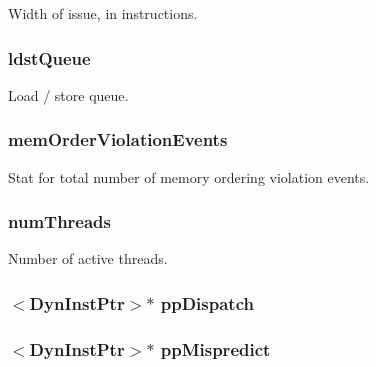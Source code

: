 \label{classDefaultIEW_a574eb3fb1659bd364f4f613662fa2ead}
Width of issue, in instructions. \hypertarget{classDefaultIEW_a9f2a7c471091519f7d05832eb48c2a9d}{
\subsubsection[{ldstQueue}]{ {\bf ldstQueue}}}
\label{classDefaultIEW_a9f2a7c471091519f7d05832eb48c2a9d}
Load / store queue. \hypertarget{classDefaultIEW_a4cca8a82790f3c5dd13bd5c0b32ad774}{
\subsubsection[{memOrderViolationEvents}]{ {\bf memOrderViolationEvents}}}
\label{classDefaultIEW_a4cca8a82790f3c5dd13bd5c0b32ad774}
Stat for total number of memory ordering violation events. \hypertarget{classDefaultIEW_a88377f855dbf5adeeecb06b5bb821d35}{
\subsubsection[{numThreads}]{ {\bf numThreads}}}
\label{classDefaultIEW_a88377f855dbf5adeeecb06b5bb821d35}
Number of active threads. \hypertarget{classDefaultIEW_acf84d288c6bc7f3ffbb09eb080dcbb7b}{
\subsubsection[{ppDispatch}]{$<${\bf DynInstPtr}$>$$\ast$ {\bf ppDispatch}}}
\label{classDefaultIEW_acf84d288c6bc7f3ffbb09eb080dcbb7b}
\hypertarget{classDefaultIEW_a78ed80917b5ebd419bf614b2e3b8f2cb}{
\subsubsection[{ppMispredict}]{$<${\bf DynInstPtr}$>$$\ast$ {\bf ppMispredict}}}
